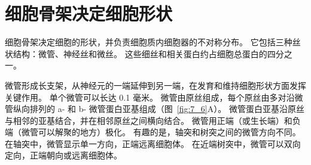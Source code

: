\section{细胞骨架决定细胞形状}

细胞骨架决定细胞的形状，并负责细胞质内细胞器的不对称分布。
它包括三种丝状结构：微管、神经丝和微丝。 
这些细丝和相关蛋白约占细胞总蛋白的四分之一。


微管形成长支架，从神经元的一端延伸到另一端，在发育和维持细胞形状方面发挥关键作用。
单个微管可以长达 0.1 毫米。
微管由原丝组成，每个原丝由多对沿微管纵向排列的 a- 和 b- 微管蛋白亚基组成（图~\ref{fig:7_6}A）。 
微管蛋白亚基沿原丝与相邻的亚基结合，并在相邻原丝之间横向结合。
微管用正端（或生长端）和负端（微管可以解聚的地方）极化。
有趣的是，轴突和树突之间的微管方向不同。
在轴突中，微管显示单一方向，正端远离细胞体。
在近端树突中，微管可以双向定向，正端朝向或远离细胞体。


